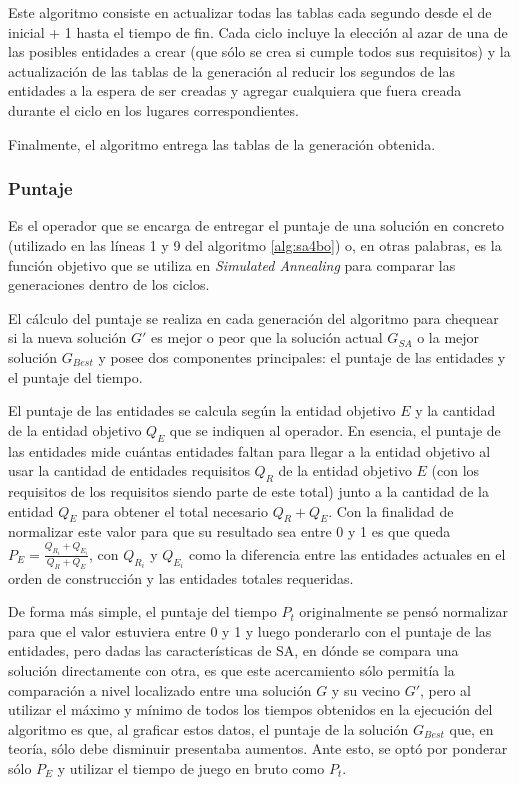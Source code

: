 Este algoritmo consiste en actualizar todas las tablas cada segundo desde el de inicial + 1 hasta el tiempo de fin. Cada ciclo incluye la elección al azar de una de las posibles entidades a crear (que sólo se crea si cumple todos sus requisitos) y la actualización de las tablas de la generación al reducir los segundos de las entidades a la espera de ser creadas y agregar cualquiera que fuera creada durante el ciclo en los lugares correspondientes.

Finalmente, el algoritmo entrega las tablas de la generación obtenida.

\subsubsection{Puntaje}

Es el operador que se encarga de entregar el puntaje de una solución en concreto (utilizado en las líneas 1 y 9 del algoritmo \ref{alg:sa4bo}) o, en otras palabras, es la función objetivo que se utiliza en \textit{Simulated Annealing} para comparar las generaciones dentro de los ciclos.

El cálculo del puntaje se realiza en cada generación del algoritmo para chequear si la nueva solución \(G'\) es mejor o peor que la solución actual $G_{SA}$ o la mejor solución $G_{Best}$ y posee dos componentes principales: el puntaje de las entidades y el puntaje del tiempo.

El puntaje de las entidades se calcula según la entidad objetivo $E$ y la cantidad de la entidad objetivo $Q_{E}$ que se indiquen al operador. En esencia, el puntaje de las entidades mide cuántas entidades faltan para llegar a la entidad objetivo al usar la cantidad de entidades requisitos $Q_{R}$ de la entidad objetivo $E$ (con los requisitos de los requisitos siendo parte de este total) junto a la cantidad de la entidad $Q_{E}$ para obtener el total necesario \(Q_R + Q_{E}\). Con la finalidad de normalizar este valor para que su resultado sea entre 0 y 1 es que queda \(P_{E} = \frac{Q_R_i + Q_E_i}{Q_R + Q_E}\), con $Q_{R}_i$ y $Q_{E}_i$ como la diferencia entre las entidades actuales en el orden de construcción y las entidades totales requeridas.

De forma más simple, el puntaje del tiempo $P_t$ originalmente se pensó normalizar para que el valor estuviera entre 0 y 1 y luego ponderarlo con el puntaje de las entidades, pero dadas las características de SA, en dónde se compara una solución directamente con otra, es que este acercamiento sólo permitía la comparación a nivel localizado entre una solución $G$ y su vecino $G'$, pero al utilizar el máximo y mínimo de todos los tiempos obtenidos en la ejecución del algoritmo es que, al graficar estos datos, el puntaje de la solución $G_{Best}$ que, en teoría, sólo debe disminuir presentaba aumentos. Ante esto, se optó por ponderar sólo $P_E$ y utilizar el tiempo de juego en bruto como $P_t$.

